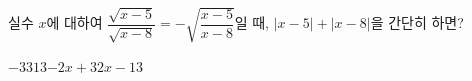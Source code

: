 실수 $x$에 대하여 $\dfrac{\sqrt{x-5}}{\sqrt{x-8}}=-\sqrt{\dfrac{x-5}{x-8}}$일 때, $|x-5|+|x-8|$을 간단히 하면? 
\begin{choices32}{$-3$}{$3$}{$13$}{$-2x+3$}{$2x-13$}\end{choices32}
